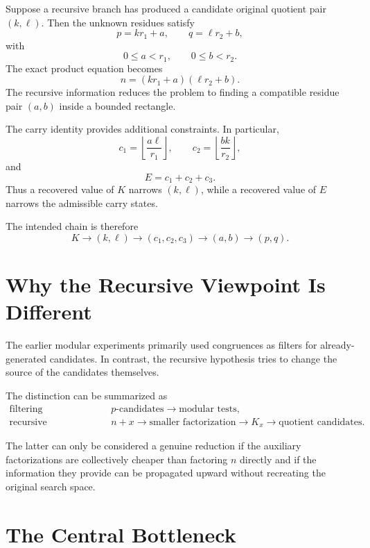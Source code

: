 \documentclass[11pt,a4paper]{article}
\begin{document}
Suppose a recursive branch has produced a candidate original quotient pair
$(k,\ell)$. Then the unknown residues satisfy
\[
    p=kr_1+a,
    \qquad
    q=\ell r_2+b,
\]
with
\[
    0\le a<r_1,
    \qquad
    0\le b<r_2.
\]
The exact product equation becomes
\begin{equation}
\label{eq:reconstruction}
    n
    =(kr_1+a)(\ell r_2+b).
\end{equation}
The recursive information reduces the problem to finding a compatible
residue pair $(a,b)$ inside a bounded rectangle.

The carry identity provides additional constraints. In particular,
\[
    c_1=\left\lfloor\frac{a\ell}{r_1}\right\rfloor,
    \qquad
    c_2=\left\lfloor\frac{bk}{r_2}\right\rfloor,
\]
and
\[
    E=c_1+c_2+c_3.
\]
Thus a recovered value of $K$ narrows $(k,\ell)$, while a recovered value
of $E$ narrows the admissible carry states.

The intended chain is therefore
\[
    K
    \rightarrow
    (k,\ell)
    \rightarrow
    (c_1,c_2,c_3)
    \rightarrow
    (a,b)
    \rightarrow
    (p,q).
\]

\section{Why the Recursive Viewpoint Is Different}

The earlier modular experiments primarily used congruences as filters for
already-generated candidates. In contrast, the recursive hypothesis tries
to change the source of the candidates themselves.

The distinction can be summarized as
\begin{align*}
    \text{filtering approach:}
    &\qquad p\text{-candidates}\rightarrow\text{modular tests},\\
    \text{recursive approach:}
    &\qquad n+x\rightarrow\text{smaller factorization}\rightarrow K_x
    \rightarrow\text{quotient candidates}.
\end{align*}

The latter can only be considered a genuine reduction if the auxiliary
factorizations are collectively cheaper than factoring $n$ directly and if
the information they provide can be propagated upward without recreating
the original search space.

\section{The Central Bottleneck}
\end{document}
